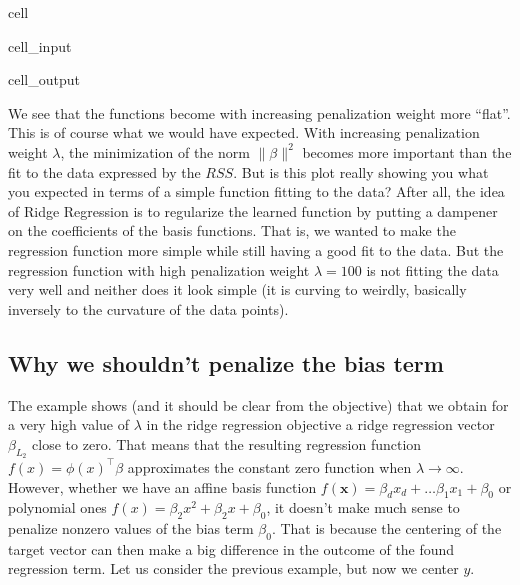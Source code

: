 \documentclass[letterpaper,10pt,english]{jupyterBook}
\begin{document}
\begin{sphinxuseclass}{cell}
\begin{sphinxVerbatimInput}
\begin{sphinxuseclass}{cell_input}
\end{sphinxuseclass}\end{sphinxVerbatimInput}
\begin{sphinxVerbatimOutput}

\begin{sphinxuseclass}{cell_output}
\noindent{}

\end{sphinxuseclass}\end{sphinxVerbatimOutput}

\end{sphinxuseclass}
\sphinxAtStartPar
We see that the functions become with increasing penalization weight more “flat”. This is of course what we would have expected. With increasing penalization weight \(\lambda\), the minimization of the norm \(\lVert\beta\rVert^2\) becomes more important than the fit to the data expressed by the \(RSS\). But is this plot really showing you what you expected in terms of a simple function fitting to the data? After all, the idea of Ridge Regression is to regularize the learned function by putting a dampener on the coefficients of the basis functions. That is, we wanted to make the regression function more simple while still having a good fit to the data. But the regression function with high penalization weight \(\lambda=100\) is not fitting the data very well and neither does it look simple (it is curving to weirdly, basically inversely to the curvature of the data points).


\subsection{Why we shouldn’t penalize the bias term}
\label{\detokenize{regression_ridge:why-we-shouldn-t-penalize-the-bias-term}}
\sphinxAtStartPar
The example shows (and it should be clear from the objective) that we obtain for a very high value of \(\lambda\) in the ridge regression objective a ridge regression vector \(\beta_{L_2}\) close to zero. That means that the resulting regression function \(f(x)=\phi(x)^\top \beta\) approximates the constant zero function when \(\lambda\rightarrow \infty\). However, whether we have an affine basis function \(f(\mathbf{x})=\beta_d x_d+\ldots \beta_1 x_1 + \beta_0\) or polynomial ones \(f(x)=\beta_2x^2+ \beta_2 x + \beta_0\), it doesn’t make much sense to penalize nonzero values of the bias term \(\beta_0\). That is because the centering of the target vector can then make a big difference in the outcome of the found regression term. Let us consider the previous example, but now we center \(y\).
\end{document}
